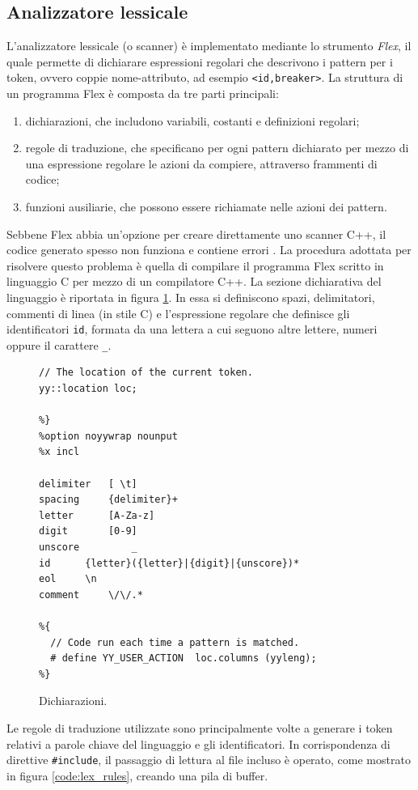 \subsection{Analizzatore lessicale}
L'analizzatore lessicale (o scanner) è implementato mediante lo strumento \emph{Flex}, il quale permette di dichiarare espressioni regolari che descrivono i pattern per i token, ovvero coppie nome-attributo, ad esempio \verb|<id,breaker>|. La struttura di un programma Flex  è composta da tre parti principali:
\begin{enumerate}
\item dichiarazioni, che includono variabili, costanti e definizioni regolari;
\item regole di traduzione, che specificano per ogni pattern dichiarato per mezzo di una espressione regolare le azioni da compiere, attraverso frammenti di codice;
\item funzioni ausiliarie, che possono essere richiamate nelle azioni dei pattern.
\end{enumerate}
Sebbene Flex abbia un'opzione per creare direttamente uno scanner C++, il codice generato spesso non funziona e contiene errori\cite{book:bison} .
La procedura adottata per risolvere questo problema è quella di compilare il programma Flex scritto in linguaggio C per mezzo di un compilatore C++.
La sezione dichiarativa del linguaggio è riportata in figura \ref{code:lex_decl}. In essa si definiscono spazi, delimitatori, commenti di linea (in stile C) e l'espressione regolare che definisce gli identificatori \verb|id|, formata da una lettera a cui seguono altre lettere, numeri oppure il carattere \verb|_|.

\begin{figure}[htbp]
\begin{verbatim}
// The location of the current token.
yy::location loc;

%}
%option noyywrap nounput
%x incl

delimiter	[ \t]
spacing		{delimiter}+
letter		[A-Za-z]
digit		[0-9]
unscore         _
id		{letter}({letter}|{digit}|{unscore})*
eol		\n
comment		\/\/.*

%{
  // Code run each time a pattern is matched.
  # define YY_USER_ACTION  loc.columns (yyleng);
%}
\end{verbatim}
\caption{Dichiarazioni.}
\label{code:lex_decl}
\end{figure}

Le regole di traduzione utilizzate sono principalmente volte a generare i token relativi a parole chiave del linguaggio e gli identificatori.
In corrispondenza di direttive \verb|#include|, il passaggio di lettura al file incluso è operato, come mostrato in figura \ref{code:lex_rules}, creando una pila di buffer. 

